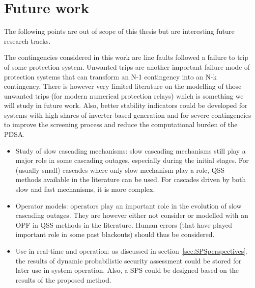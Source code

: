 \section{Future work}

The following points are out of scope of this thesis but are interesting future research tracks.


The contingencies considered in this work are line faults followed a failure to trip of some protection system. Unwanted trips are another important failure mode of protection systems that can transform an N-1 contingency into an N-k contingency. There is however very limited literature on the modelling of those unwanted trips (for modern numerical protection relays) which is something we will study in future work. Also, better stability indicators could be developed for systems with high shares of inverter-based generation and for severe contingencies to improve the screening process and reduce the computational burden of the PDSA.

\begin{itemize}
    \item Study of slow cascading mechanisms: slow cascading mechanisms still play a major role in some cascading outages, especially during the initial stages. For (usually small) cascades where only slow mechanism play a role, QSS methods available in the literature can be used. For cascades driven by both slow and fast mechanisms, it is more complex. %
    \item Operator models: operators play an important role in the evolution of slow cascading outages. They are however either not consider or modelled with an OPF in QSS methods in the literature. Human errors (that have played important role in some past blackouts) should thus be considered.
    \item Use in real-time and operation: as discussed in section~\ref{sec:SPSperspectives}, the results of dynamic probabilistic security assessment could be stored for later use in system operation. Also, a SPS could be designed based on the results of the proposed method.
\end{itemize}


